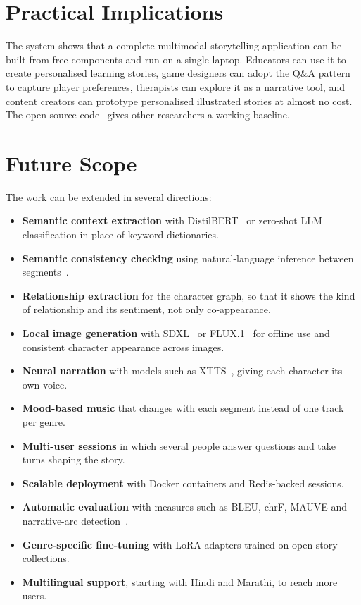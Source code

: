 \section{Practical Implications}

The system shows that a complete multimodal storytelling application can be built from free components and run on a single laptop. Educators can use it to create personalised learning stories, game designers can adopt the Q\&A pattern to capture player preferences, therapists can explore it as a narrative tool, and content creators can prototype personalised illustrated stories at almost no cost. The open-source code~\citep{jha2026repo} gives other researchers a working baseline.

\section{Future Scope}

The work can be extended in several directions:

\begin{itemize}
    \item \textbf{Semantic context extraction} with DistilBERT~\citep{sanh2019distilbert} or zero-shot LLM classification in place of keyword dictionaries.
    \item \textbf{Semantic consistency checking} using natural-language inference between segments~\citep{williams2018mnli}.
    \item \textbf{Relationship extraction} for the character graph, so that it shows the kind of relationship and its sentiment, not only co-appearance.
    \item \textbf{Local image generation} with SDXL~\citep{podell2024sdxl} or FLUX.1~\citep{bfl2024flux} for offline use and consistent character appearance across images.
    \item \textbf{Neural narration} with models such as XTTS~\citep{casanova2024xtts}, giving each character its own voice.
    \item \textbf{Mood-based music} that changes with each segment instead of one track per genre.
    \item \textbf{Multi-user sessions} in which several people answer questions and take turns shaping the story.
    \item \textbf{Scalable deployment} with Docker containers and Redis-backed sessions.
    \item \textbf{Automatic evaluation} with measures such as BLEU, chrF, MAUVE and narrative-arc detection~\citep{lin2024evalnarrate}.
    \item \textbf{Genre-specific fine-tuning} with LoRA adapters trained on open story collections.
    \item \textbf{Multilingual support}, starting with Hindi and Marathi, to reach more users.
\end{itemize}

